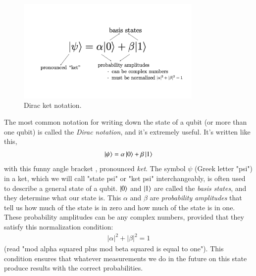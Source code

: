 \begin{figure}[H]
    \centering
    \includegraphics[width=0.8\textwidth]{lesson2/R2L2fig1.pdf}
    
        \caption{Dirac ket notation.}
    
    \label{fig:ket-notation}
\end{figure}

The most common notation for writing down the state of a qubit (or more than one qubit) is called the \emph{Dirac notation}, and it's extremely useful. It's written like this,
\begin{align}
\left| \psi \right\rangle = \alpha\left| 0 \right\rangle + \beta\left| 1 \right\rangle
\end{align}
with this funny angle bracket \ket{}, pronounced \emph{ket}. The symbol $\psi$ (Greek letter "psi") in a ket, which we will call "state psi" or "ket psi" interchangeably, is often used to describe a general state of a qubit. $\left| 0 \right\rangle$ and $\left| 1 \right\rangle$ are called the \emph{basis states}, and they determine what our state is. This $\alpha$ and $\beta$ are \emph{probability amplitudes} that tell us how much of the state is in zero and how much of the state is in one.  These probability amplitudes can be any complex numbers, provided that they satisfy this normalization condition:
\begin{align}
    |\alpha|^2 + |\beta|^2 = 1
    \label{eq:normalization-condition}
\end{align}
(read "mod alpha squared plus mod beta squared is equal to one"). This condition ensures that whatever measurements we do in the future on this state produce results with the correct probabilities.


